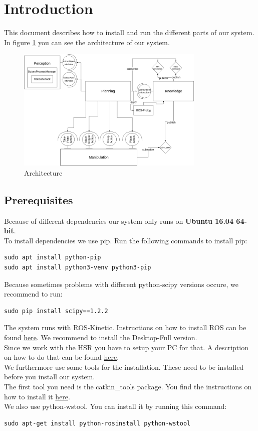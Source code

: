 \documentclass[main.tex]{subfiles}
\begin{document}
\newpage
	\section{Introduction}
	This document describes how to install and run the different parts of our system.\\
	In figure \ref{fig:architecture} you can see the architecture of our system.
	\begin{figure}[h]
\centering
\includegraphics[width=0.8\textwidth]{architecture/architecture}
\caption{Architecture}
\label{fig:architecture}
\end{figure}
	
	\subsection{Prerequisites}
	
	Because of different dependencies our system only runs on \textbf{Ubuntu 16.04 64-bit}.\\
	To install dependencies we use pip. Run the following commands to install pip:
	\begin{lstlisting}
sudo apt install python-pip
sudo apt install python3-venv python3-pip
\end{lstlisting}
Because sometimes problems with different python-scipy versions occure, we recommend to run:
\begin{lstlisting}
sudo pip install scipy==1.2.2
\end{lstlisting}
	The system runs with ROS-Kinetic. Instructions on how to install ROS can be found \href{http://wiki.ros.org/kinetic/Installation/Ubuntu}{here}. We recommend to install the Desktop-Full version.\\
	Since we work with the HSR you have to setup your PC for that.
	A description on how to do that can be found \href{https://docs.hsr.io/manual_en/howto/pc_install.html}{here}.\\
	We furthermore use some tools for the installation. These need to be installed before you install our system.\\
	The first tool you need is the catkin\_tools package. You find the instructions on how to install it \href{https://catkin-tools.readthedocs.io/en/latest/installing.html}{here}.\\
	We also use python-wstool.
	You can install it by running this command:
	\begin{lstlisting}
sudo apt-get install python-rosinstall python-wstool
\end{lstlisting}
\end{document}
